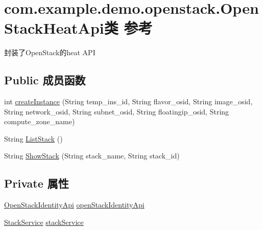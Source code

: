 \hypertarget{classcom_1_1example_1_1demo_1_1openstack_1_1_open_stack_heat_api}{}\section{com.\+example.\+demo.\+openstack.\+Open\+Stack\+Heat\+Api类 参考}
\label{classcom_1_1example_1_1demo_1_1openstack_1_1_open_stack_heat_api}


封装了\+Open\+Stack的heat A\+PI  


\subsection*{Public 成员函数}
\begin{DoxyCompactItemize}
\item 
int \mbox{\hyperlink{classcom_1_1example_1_1demo_1_1openstack_1_1_open_stack_heat_api_afd9025ea425d8a2f0a4104f815412ff5}{create\+Instance}} (String temp\+\_\+ins\+\_\+id, String flavor\+\_\+osid, String image\+\_\+osid, String network\+\_\+osid, String subnet\+\_\+osid, String floatingip\+\_\+osid, String compute\+\_\+zone\+\_\+name)
\item 
String \mbox{\hyperlink{classcom_1_1example_1_1demo_1_1openstack_1_1_open_stack_heat_api_a40dd4e47172ac7c2b3c5b482ecab3719}{List\+Stack}} ()
\item 
String \mbox{\hyperlink{classcom_1_1example_1_1demo_1_1openstack_1_1_open_stack_heat_api_ada71cdc0a64ab443af19800d0d213221}{Show\+Stack}} (String stack\+\_\+name, String stack\+\_\+id)
\end{DoxyCompactItemize}
\subsection*{Private 属性}
\begin{DoxyCompactItemize}
\item 
\mbox{\hyperlink{classcom_1_1example_1_1demo_1_1openstack_1_1_open_stack_identity_api}{Open\+Stack\+Identity\+Api}} \mbox{\hyperlink{classcom_1_1example_1_1demo_1_1openstack_1_1_open_stack_heat_api_a6e4e841c9169e8152cd74806a1cec9ec}{open\+Stack\+Identity\+Api}}
\item 
\mbox{\hyperlink{classcom_1_1example_1_1demo_1_1service_1_1_stack_service}{Stack\+Service}} \mbox{\hyperlink{classcom_1_1example_1_1demo_1_1openstack_1_1_open_stack_heat_api_a8a556ef0e43c2081a63b99675eee1089}{stack\+Service}}
\end{DoxyCompactItemize}


